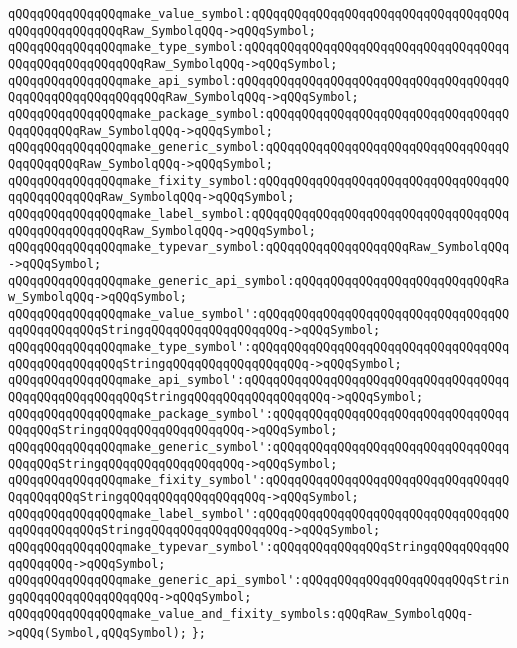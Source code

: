 \verb|qQQqqQQqqQQqqQQqmake_value_symbol:qQQqqQQqqQQqqQQqqQQqqQQqqQQqqQQqqQQqqQQqqQQqqQQqqQQqRaw_SymbolqQQq->qQQqSymbol;|\newline
\verb|qQQqqQQqqQQqqQQqmake_type_symbol:qQQqqQQqqQQqqQQqqQQqqQQqqQQqqQQqqQQqqQQqqQQqqQQqqQQqqQQqRaw_SymbolqQQq->qQQqSymbol;|\newline
\verb|qQQqqQQqqQQqqQQqmake_api_symbol:qQQqqQQqqQQqqQQqqQQqqQQqqQQqqQQqqQQqqQQqqQQqqQQqqQQqqQQqqQQqRaw_SymbolqQQq->qQQqSymbol;|\newline
\verb|qQQqqQQqqQQqqQQqmake_package_symbol:qQQqqQQqqQQqqQQqqQQqqQQqqQQqqQQqqQQqqQQqqQQqRaw_SymbolqQQq->qQQqSymbol;|\newline
\verb|qQQqqQQqqQQqqQQqmake_generic_symbol:qQQqqQQqqQQqqQQqqQQqqQQqqQQqqQQqqQQqqQQqqQQqRaw_SymbolqQQq->qQQqSymbol;|\newline
\verb|qQQqqQQqqQQqqQQqmake_fixity_symbol:qQQqqQQqqQQqqQQqqQQqqQQqqQQqqQQqqQQqqQQqqQQqqQQqRaw_SymbolqQQq->qQQqSymbol;|\newline
\verb|qQQqqQQqqQQqqQQqmake_label_symbol:qQQqqQQqqQQqqQQqqQQqqQQqqQQqqQQqqQQqqQQqqQQqqQQqqQQqRaw_SymbolqQQq->qQQqSymbol;|\newline
\verb|qQQqqQQqqQQqqQQqmake_typevar_symbol:qQQqqQQqqQQqqQQqqQQqRaw_SymbolqQQq->qQQqSymbol;|\newline
\verb|qQQqqQQqqQQqqQQqmake_generic_api_symbol:qQQqqQQqqQQqqQQqqQQqqQQqqQQqRaw_SymbolqQQq->qQQqSymbol;|\newline
\newline
\verb|qQQqqQQqqQQqqQQqmake_value_symbol':qQQqqQQqqQQqqQQqqQQqqQQqqQQqqQQqqQQqqQQqqQQqqQQqStringqQQqqQQqqQQqqQQqqQQq->qQQqSymbol;|\newline
\verb|qQQqqQQqqQQqqQQqmake_type_symbol':qQQqqQQqqQQqqQQqqQQqqQQqqQQqqQQqqQQqqQQqqQQqqQQqqQQqStringqQQqqQQqqQQqqQQqqQQq->qQQqSymbol;|\newline
\verb|qQQqqQQqqQQqqQQqmake_api_symbol':qQQqqQQqqQQqqQQqqQQqqQQqqQQqqQQqqQQqqQQqqQQqqQQqqQQqqQQqStringqQQqqQQqqQQqqQQqqQQq->qQQqSymbol;|\newline
\verb|qQQqqQQqqQQqqQQqmake_package_symbol':qQQqqQQqqQQqqQQqqQQqqQQqqQQqqQQqqQQqqQQqStringqQQqqQQqqQQqqQQqqQQq->qQQqSymbol;|\newline
\verb|qQQqqQQqqQQqqQQqmake_generic_symbol':qQQqqQQqqQQqqQQqqQQqqQQqqQQqqQQqqQQqqQQqStringqQQqqQQqqQQqqQQqqQQq->qQQqSymbol;|\newline
\verb|qQQqqQQqqQQqqQQqmake_fixity_symbol':qQQqqQQqqQQqqQQqqQQqqQQqqQQqqQQqqQQqqQQqqQQqStringqQQqqQQqqQQqqQQqqQQq->qQQqSymbol;|\newline
\verb|qQQqqQQqqQQqqQQqmake_label_symbol':qQQqqQQqqQQqqQQqqQQqqQQqqQQqqQQqqQQqqQQqqQQqqQQqStringqQQqqQQqqQQqqQQqqQQq->qQQqSymbol;|\newline
\verb|qQQqqQQqqQQqqQQqmake_typevar_symbol':qQQqqQQqqQQqqQQqStringqQQqqQQqqQQqqQQqqQQq->qQQqSymbol;|\newline
\verb|qQQqqQQqqQQqqQQqmake_generic_api_symbol':qQQqqQQqqQQqqQQqqQQqqQQqStringqQQqqQQqqQQqqQQqqQQq->qQQqSymbol;|\newline
\newline
\verb|qQQqqQQqqQQqqQQqmake_value_and_fixity_symbols:qQQqRaw_SymbolqQQq->qQQq(Symbol,qQQqSymbol);|\newline
\verb|};|\newline

